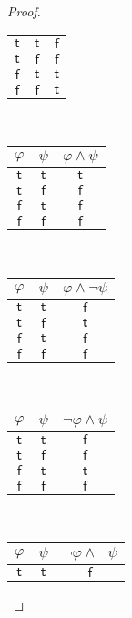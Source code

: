 \documentclass[12pt]{article}
\begin{document}
\begin{proof}
\begin{center}
\begin{tabular}{cc|c}
            $\mathsf{t}$ & $\mathsf{t}$ & $\mathsf{f}$ \\
            $\mathsf{t}$ & $\mathsf{f}$ & $\mathsf{f}$ \\
            $\mathsf{f}$ & $\mathsf{t}$ & $\mathsf{t}$ \\
            $\mathsf{f}$ & $\mathsf{f}$ & $\mathsf{t}$ \\
        \end{tabular}
        ~~~~~~~~~~~~~
        \begin{tabular}{cc|c}
            $\varphi$ & $\psi$ & $\varphi \land \psi$ \\ \hline
            $\mathsf{t}$ & $\mathsf{t}$ & $\mathsf{t}$ \\
            $\mathsf{t}$ & $\mathsf{f}$ & $\mathsf{f}$ \\
            $\mathsf{f}$ & $\mathsf{t}$ & $\mathsf{f}$ \\
            $\mathsf{f}$ & $\mathsf{f}$ & $\mathsf{f}$ \\
        \end{tabular}
        ~~
        \begin{tabular}{cc|c}
            $\varphi$ & $\psi$ & $\varphi \land \neg \psi$ \\ \hline
            $\mathsf{t}$ & $\mathsf{t}$ & $\mathsf{f}$ \\
            $\mathsf{t}$ & $\mathsf{f}$ & $\mathsf{t}$ \\
            $\mathsf{f}$ & $\mathsf{t}$ & $\mathsf{f}$ \\
            $\mathsf{f}$ & $\mathsf{f}$ & $\mathsf{f}$ \\
        \end{tabular}
        ~~
        \begin{tabular}{cc|c}
            $\varphi$ & $\psi$ & $\neg \varphi \land \psi$ \\ \hline
            $\mathsf{t}$ & $\mathsf{t}$ & $\mathsf{f}$ \\
            $\mathsf{t}$ & $\mathsf{f}$ & $\mathsf{f}$ \\
            $\mathsf{f}$ & $\mathsf{t}$ & $\mathsf{t}$ \\
            $\mathsf{f}$ & $\mathsf{f}$ & $\mathsf{f}$ \\
        \end{tabular}
        ~~
        \begin{tabular}{cc|c}
            $\varphi$ & $\psi$ & $\neg \varphi \land \neg \psi$ \\ \hline
            $\mathsf{t}$ & $\mathsf{t}$ & $\mathsf{f}$ \\

\end{tabular}
\end{center}
\end{proof}
\end{document}
